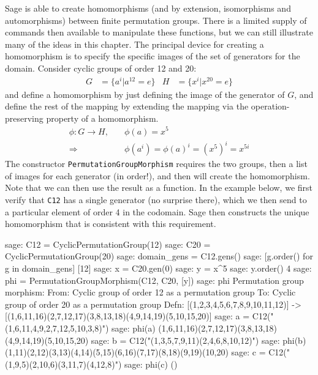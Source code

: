 Sage is able to create homomorphisms (and by extension, isomorphisms and automorphisms) between finite permutation groups.  There is a limited supply of commands then available to manipulate these functions, but we can still illustrate many of the ideas in this chapter.
%
%
The principal device for creating a homomorphism is to specify the specific images of the set of generators for the domain.  Consider cyclic groups of order 12 and 20:
%
\begin{align*}
G &= \{a^i\vert a^{12}=e\}
&
H &= \{x^i\vert x^{20}=e\}
\end{align*}
%
and define a homomorphism by just defining the image of the generator of $G$, and define the rest of the mapping by extending the mapping via the operation-preserving property of a homomorphism.
%
\begin{align*}
\phi: G\rightarrow H, &\quad\phi(a)=x^5\\
\Rightarrow           &\quad\phi(a^i) = \phi(a)^i = (x^5)^i = x ^{5i}
\end{align*}
%
The constructor \verb?PermutationGroupMorphism? requires the two groups, then a list of images for each generator (in order!), and then will create the homomorphism.  Note that we can then use the result as a function.  In the example below, we first verify that \verb?C12? has a single generator (no surprise there), which we then send to a particular element of order 4 in the codomain.  Sage then constructs the unique homomorphism that is consistent with this requirement.
%
\begin{sageexample}
sage: C12 = CyclicPermutationGroup(12)
sage: C20 = CyclicPermutationGroup(20)
sage: domain_gens = C12.gens()
sage: [g.order() for g in domain_gens]
[12]
sage: x = C20.gen(0)
sage: y = x^5
sage: y.order()
4
sage: phi = PermutationGroupMorphism(C12, C20, [y])
sage: phi
Permutation group morphism:
  From: Cyclic group of order 12 as a permutation group
  To:   Cyclic group of order 20 as a permutation group
  Defn: [(1,2,3,4,5,6,7,8,9,10,11,12)] ->
        [(1,6,11,16)(2,7,12,17)(3,8,13,18)(4,9,14,19)(5,10,15,20)]
sage: a = C12("(1,6,11,4,9,2,7,12,5,10,3,8)")
sage: phi(a)
(1,6,11,16)(2,7,12,17)(3,8,13,18)(4,9,14,19)(5,10,15,20)
sage: b = C12("(1,3,5,7,9,11)(2,4,6,8,10,12)")
sage: phi(b)
(1,11)(2,12)(3,13)(4,14)(5,15)(6,16)(7,17)(8,18)(9,19)(10,20)
sage: c = C12("(1,9,5)(2,10,6)(3,11,7)(4,12,8)")
sage: phi(c)
()
\end{sageexample}
